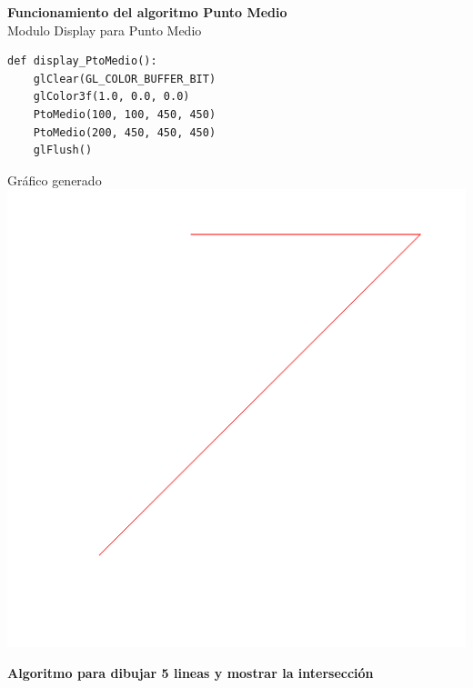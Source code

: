 \documentclass[a4paper]{article}
\begin{document}
\Large{\textbf{Funcionamiento del algoritmo Punto Medio}}\\[0.5cm]
Modulo Display para Punto Medio 
\begin{center}
\begin{mycodebox}
\begin{lstlisting}
def display_PtoMedio():
    glClear(GL_COLOR_BUFFER_BIT)
    glColor3f(1.0, 0.0, 0.0)
    PtoMedio(100, 100, 450, 450)
    PtoMedio(200, 450, 450, 450)
    glFlush()
\end{lstlisting}
\end{mycodebox}
\end{center}
Gráfico generado\\
\includegraphics[width=15cm]{src/PtoMedio.png}\\
\newpage

\Large{\textbf{Algoritmo para dibujar 5 lineas y mostrar la intersección}}\\[0.5cm]

\end{document}
